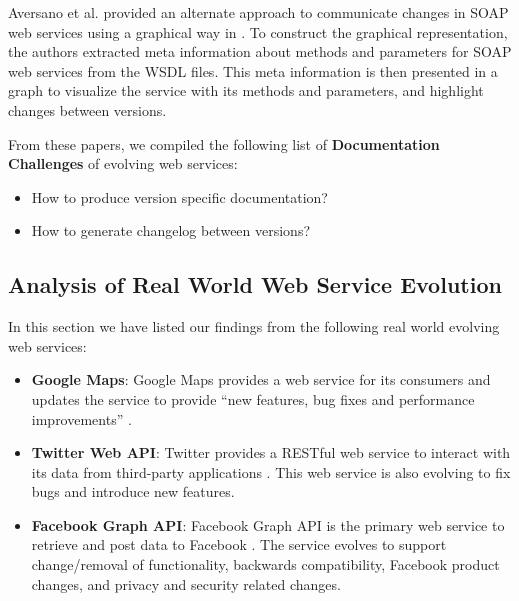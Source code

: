 \documentclass[runningheads,a4paper]{llncs}
\begin{document}
Aversano et al. provided an alternate approach to communicate changes in SOAP web services using a graphical way in \cite{aversano2005visualizing}. To construct the graphical representation, the authors extracted meta information about methods and parameters for SOAP web services from the WSDL files. This meta information is then presented in a graph to visualize the service with its methods and parameters, and highlight changes between versions.

From these papers, we compiled the following list of \textbf{Documentation Challenges} of evolving web services:

\begin{itemize}
  \item How to produce version specific documentation?
  \item How to generate changelog between versions?
\end{itemize}



\subsection{Analysis of Real World Web Service Evolution} %
\label{sub:review_of_industry_examples}

In this section we have listed our findings from the following real world evolving web services:

\begin{itemize}
  \item \textbf{Google Maps}: Google Maps provides a web service for its consumers and updates the service to provide ``new features, bug fixes and performance improvements'' \cite{google_maps_versioning}.
  \item \textbf{Twitter Web API}: Twitter provides a RESTful web service to interact with its data from third-party applications \cite{twitter_api}. This web service is also evolving to fix bugs and introduce new features.
  \item \textbf{Facebook Graph API}: Facebook Graph API is the primary web service to retrieve and post data to Facebook \cite{facebook_api}. The service evolves to support change/removal of functionality, backwards compatibility, Facebook product changes, and privacy and security related changes.
\end{itemize}
\end{document}
